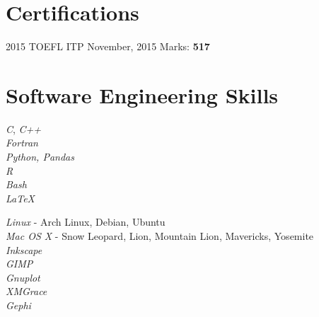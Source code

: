 \documentclass[10pt]{article} %
\begin{document}

\section{Certifications}

\job
{2015}{}
{TOEFL ITP}
{November, 2015}
{Marks: {\bf 517}}
{}

\section{Software Engineering Skills}

{
\textit{C},
\textit{C++} \\
\textit{Fortran}\\
\textit{Python, Pandas}\\
\textit{R}\\
\textit{Bash}\\
\textit{\LaTeX}\\
}




{
\textit{Linux} - Arch Linux, Debian, Ubuntu\\
\textit{Mac OS X} - Snow Leopard, Lion, Mountain Lion, Mavericks, Yosemite\\
\textit{Inkscape}\\
\textit{GIMP}\\
\textit{Gnuplot}\\
\textit{XMGrace}\\
\textit{Gephi}\\
}

\end{document}
